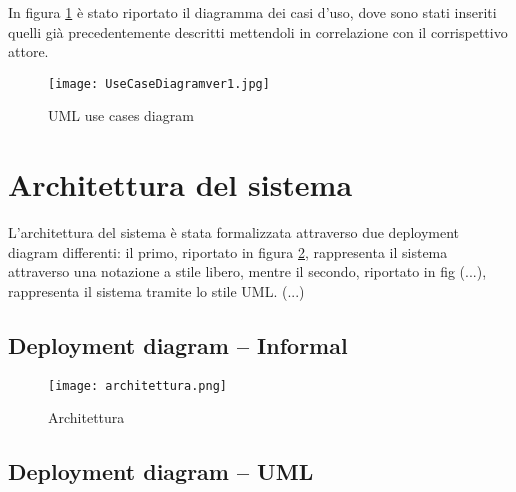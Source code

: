 In figura \ref{fig-uml-use-cases} è stato riportato il diagramma dei casi d'uso, dove sono stati inseriti quelli
già precedentemente descritti mettendoli in correlazione con il corrispettivo attore.

\begin{figure}[H]
      \centering
      \texttt{[image: UseCaseDiagramver1.jpg]}
      \caption{UML use cases diagram}
      \label{fig-uml-use-cases}
\end{figure}


\newpage
\section{Architettura del sistema}
L'architettura del sistema è stata formalizzata attraverso due deployment diagram differenti: 
il primo, riportato in figura \ref{architettura}, rappresenta il sistema
attraverso una notazione a stile libero, mentre il secondo, riportato in fig (...), rappresenta
il sistema tramite lo stile UML. (...)

\subsection{Deployment diagram -- Informal}
\begin{figure}[H]
      \centering
      \texttt{[image: architettura.png]}
      \caption{Architettura}
      \label{architettura}
\end{figure}



\subsection{Deployment diagram -- UML}

